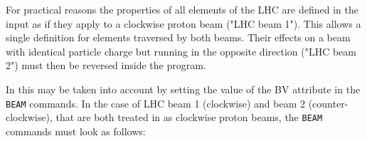 For practical reasons the properties of all elements of the LHC are
defined in the \madx input as if they apply to a clockwise proton beam
("LHC beam 1"). This allows a single definition for elements traversed
by both beams. Their effects on a beam with identical particle charge
but running in the opposite direction ("LHC beam 2") must then be
reversed inside the program.  

In \madx this may be taken into account by setting the value of
the BV attribute in the {\tt BEAM} commands. In the case of LHC beam 1
(clockwise) and beam 2 (counter-clockwise), that are both treated in
\madx as clockwise proton beams, the {\tt BEAM} commands must look as follows:  






